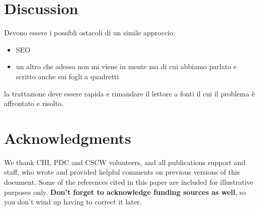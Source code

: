 \documentclass{sig-alternate-05-2015}
\begin{document}
\section{Discussion}
Devono essere i possibli ostacoli di un simile approccio:

\begin{itemize}
  \item SEO
  \item un altro che adesso non mi viene in mente ma di cui abbiamo parlato e scritto anche sui fogli a quadretti
\end{itemize}

la trattazione deve essere rapida e rimandare il lettore a fonti il cui il problema è affrontato e risolto.

\section{Acknowledgments}

We thank CHI, PDC and CSCW volunteers, and all publications support
and staff, who wrote and provided helpful comments on previous
versions of this document.  Some of the references cited in this paper
are included for illustrative purposes only.  \textbf{Don't forget
to acknowledge funding sources as well}, so you don't wind up
having to correct it later.





\balancecolumns
\end{document}
